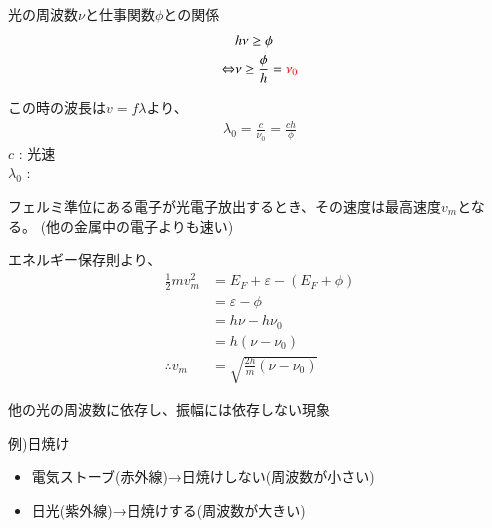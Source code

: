 \documentclass[12pt]{jsarticle}
\begin{document}
光の周波数$\nu$と仕事関数$\phi$との関係
\begin{align*}
&h\nu\ge\phi\\
\Leftrightarrow&\nu\ge\frac\phi h=\textcolor{red}{\nu_0}
\end{align*}

この時の波長は$v=f\lambda$より、
\begin{align*}
\lambda_0=\frac c{\nu_0}=\frac{ch}\phi
\end{align*}
$c$ : 光速\\
$\lambda_0$ : 


フェルミ準位にある電子が光電子放出するとき、その速度は最高速度$v_m$となる。
(他の金属中の電子よりも速い)

エネルギー保存則より、
\begin{align*}
\frac12mv_m^2&=E_F+\varepsilon-(E_F+\phi)\\
&=\varepsilon-\phi\\
&=h\nu-h\nu_0\\
&=h(\nu-\nu_0)\\
\therefore v_m&=\sqrt{\frac{2h}m (\nu-\nu_0)}
\end{align*}

他の光の周波数に依存し、振幅には依存しない現象

例)日焼け
\begin{itemize}
\item 電気ストーブ(赤外線)→日焼けしない(周波数が小さい)
\item 日光(紫外線)→日焼けする(周波数が大きい)
\end{itemize}
\end{document}
